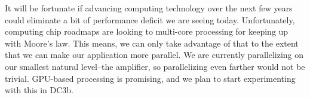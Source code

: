 It will be fortunate if advancing computing technology over the next
few years could eliminate a bit of performance deficit we are seeing
today.  Unfortunately, computing chip roadmaps are looking to
multi-core processing for keeping up with Moore's law.  This means, we
can only take advantage of that to the extent that we can make our
application more parallel.  We are currently parallelizing on our
smallest natural level--the amplifier, so parallelizing even farther
would not be trivial.  GPU-based processing is promising, and we plan
to start experimenting with this in DC3b. 





